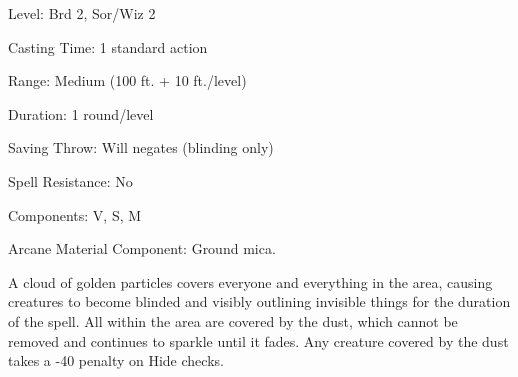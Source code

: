 
\begin{description*}
\item[Level:] Brd 2, Sor/Wiz 2
\item[Casting Time:] 1 standard action
\item[Range:] Medium (100 ft. + 10 ft./level)
\item[Duration:] 1 round/level
\item[Saving Throw:] Will negates (blinding only)
\item[Spell Resistance:] No
\item[Components:] V, S, M
\item[Arcane Material Component:] Ground mica.
\end{description*}

A cloud of golden particles covers everyone and everything in the area, causing
creatures to become blinded and visibly outlining invisible things for the duration
of the spell. All within the area are covered by the dust, which cannot be removed
and continues to sparkle until it fades.
Any creature covered by the dust takes a -40 penalty on Hide checks.